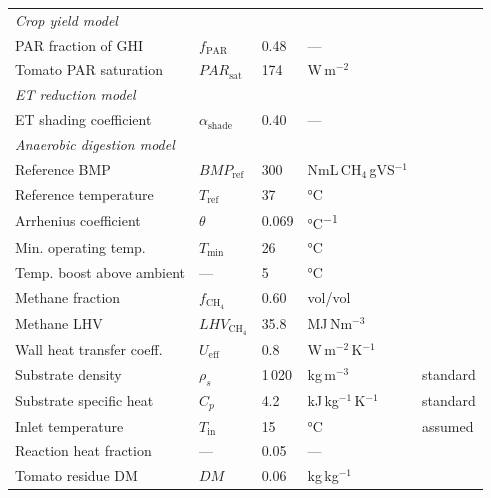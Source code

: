\begin{table}[H]
\begin{tabular}{lllll}
		\midrule
		\multicolumn{5}{l}{\textit{Crop yield model}} \\
		PAR fraction of GHI      & $f_{\text{PAR}}$     & 0.48
		& ---                  & \citet{mccree1971} \\
		Tomato PAR saturation    & $PAR_{\text{sat}}$   & 174
		& W\,m$^{-2}$          & \citet{mohammedi2023} \\
		\midrule
		\multicolumn{5}{l}{\textit{ET reduction model}} \\
		ET shading coefficient   & $\alpha_{\text{shade}}$ & 0.40
		& ---                  & \citet{elamri2018} \\
		\midrule
		\multicolumn{5}{l}{\textit{Anaerobic digestion model}} \\
		Reference BMP            & $BMP_{\text{ref}}$   & 300
		& NmL\,CH$_4$\,gVS$^{-1}$ & \citet{lallement2023} \\
		Reference temperature    & $T_{\text{ref}}$     & 37
		& \si{\celsius}        & \citet{lindorfer2008} \\
		Arrhenius coefficient    & $\theta$             & 0.069
		& \si{\celsius^{-1}}   & \citet{pilarski2025} \\
		Min. operating temp.     & $T_{\text{min}}$     & 26
		& \si{\celsius}        & \citet{lindorfer2008} \\
		Temp. boost above ambient & ---                 & 5
		& \si{\celsius}        & \citet{lindorfer2008} \\
		Methane fraction         & $f_{\text{CH}_4}$   & 0.60
		& vol/vol              & \citet{marchaim1992} \\
		Methane LHV              & $LHV_{\text{CH}_4}$ & 35.8
		& MJ\,Nm$^{-3}$        & \citet{marchaim1992} \\
		Wall heat transfer coeff.& $U_{\text{eff}}$     & 0.8
		& W\,m$^{-2}$\,K$^{-1}$ & \citet{lindorfer2008} \\
		Substrate density        & $\rho_s$             & 1\,020
		& kg\,m$^{-3}$         & standard \\
		Substrate specific heat  & $C_p$                & 4.2
		& kJ\,kg$^{-1}$\,K$^{-1}$ & standard \\
		Inlet temperature        & $T_{\text{in}}$      & 15
		& \si{\celsius}        & assumed \\
		Reaction heat fraction   & ---                  & 0.05
		& ---                  & \citet{pal2024} \\
		Tomato residue DM        & $DM$                 & 0.06
		& kg\,kg$^{-1}$        & \citet{mohammedi2023} \\

\end{tabular}
\end{table}
